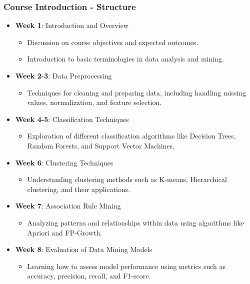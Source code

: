 \documentclass[aspectratio=169]{beamer}
\begin{document}
\begin{frame}[fragile]
    \frametitle{Course Introduction - Structure}
    \begin{itemize}
        \item \textbf{Week 1}: Introduction and Overview
        \begin{itemize}
            \item Discussion on course objectives and expected outcomes.
            \item Introduction to basic terminologies in data analysis and mining.
        \end{itemize}
        
        \item \textbf{Week 2-3}: Data Preprocessing
        \begin{itemize}
            \item Techniques for cleaning and preparing data, including handling missing values, normalization, and feature selection.
        \end{itemize}
        
        \item \textbf{Week 4-5}: Classification Techniques
        \begin{itemize}
            \item Exploration of different classification algorithms like Decision Trees, Random Forests, and Support Vector Machines.
        \end{itemize}
        
        \item \textbf{Week 6}: Clustering Techniques
        \begin{itemize}
            \item Understanding clustering methods such as K-means, Hierarchical clustering, and their applications.
        \end{itemize}
        
        \item \textbf{Week 7}: Association Rule Mining
        \begin{itemize}
            \item Analyzing patterns and relationships within data using algorithms like Apriori and FP-Growth.
        \end{itemize}
        
        \item \textbf{Week 8}: Evaluation of Data Mining Models
        \begin{itemize}
            \item Learning how to assess model performance using metrics such as accuracy, precision, recall, and F1-score.
        \end{itemize}
        

\end{itemize}
\end{frame}
\end{document}
